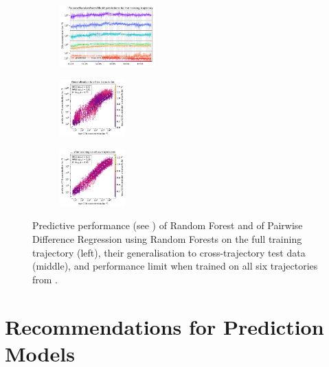 \begin{figure}[H]
    \begin{subfigure}
    \centering
    \includegraphics[width=0.4\textwidth]{prediction/figures/models/pairwiserandomforestmodel-training-prediction.pdf}
    \end{subfigure}
    \begin{subfigure}
    \centering
    \includegraphics[width=0.275\textwidth]{prediction/figures/models/pairwiserandomforestmodel-test-generalisation.pdf}
    \end{subfigure}
    \begin{subfigure}
    \centering
    \includegraphics[width=0.275\textwidth]{prediction/figures/models/pairwiserandomforestmodel-test-prediction.pdf}
    \end{subfigure}

    \vspace{-1em}
    \caption[Predictive Performance of Random Forests and Pairwise Difference Regression with RFs]{Predictive performance (see ) of Random Forest and of Pairwise Difference Regression using Random Forests \cite{padre-rf-2021} on the full training trajectory (left), their generalisation to cross-trajectory test data (middle), and performance limit when trained on all six trajectories from .}
    \label{fig:rf-padre-rf-models}
\end{figure}

\section{Recommendations for Prediction Models} \label{txt:model-conclusions}

